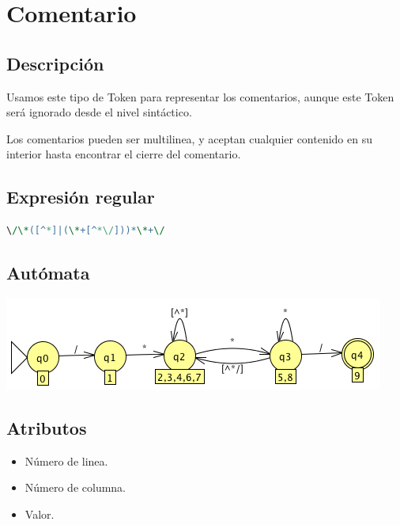             \hfill
            \clearpage
            
     
    
    \section{Comentario}
    
        \subsection{Descripción}
        
            Usamos este tipo de Token para representar los comentarios, aunque este Token será ignorado desde el nivel sintáctico.
            
            Los comentarios pueden ser multilinea, y aceptan cualquier contenido en su interior hasta encontrar el cierre del comentario.
        
        \subsection{Expresión regular}
            
             \begin{lstlisting}[language=Perl]
\/\*([^*]|(\*+[^*\/]))*\*+\/
             \end{lstlisting}
            
        \subsection{Autómata}
        
            \includegraphics[scale=.7]{../Design/jflap/Comentario.png}

        \subsection{Atributos}
        
            \begin{itemize}
                \item Número de linea.
                \item Número de columna.
                \item Valor.
            \end{itemize}
            
